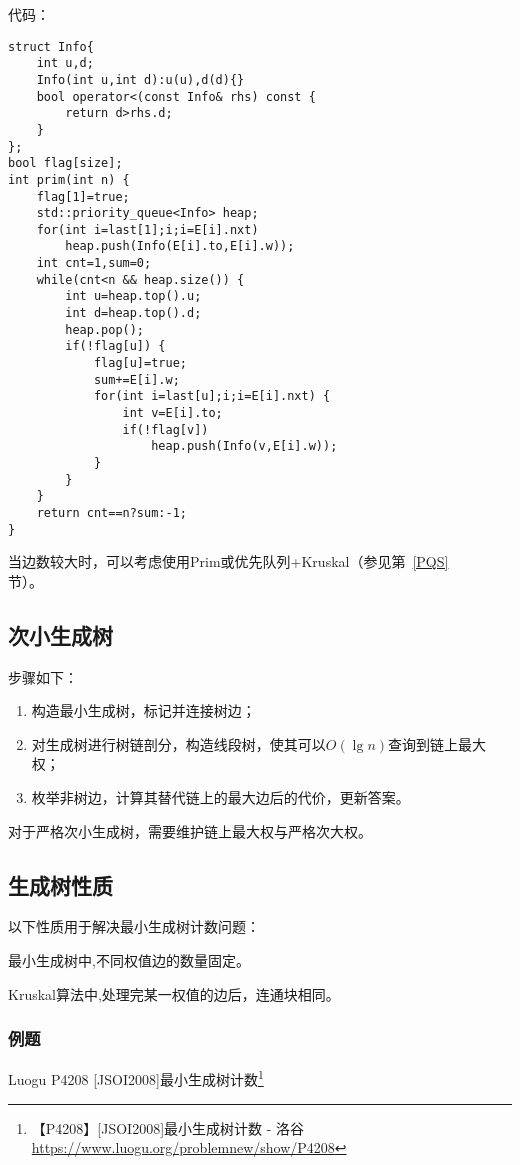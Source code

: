 代码：
\begin{lstlisting}
struct Info{
    int u,d;
    Info(int u,int d):u(u),d(d){}
    bool operator<(const Info& rhs) const {
        return d>rhs.d;
    }
};
bool flag[size];
int prim(int n) {
    flag[1]=true;
    std::priority_queue<Info> heap;
    for(int i=last[1];i;i=E[i].nxt)
        heap.push(Info(E[i].to,E[i].w));
    int cnt=1,sum=0;
    while(cnt<n && heap.size()) {
        int u=heap.top().u;
        int d=heap.top().d;
        heap.pop();
        if(!flag[u]) {
            flag[u]=true;
            sum+=E[i].w;
            for(int i=last[u];i;i=E[i].nxt) {
                int v=E[i].to;
                if(!flag[v])
                    heap.push(Info(v,E[i].w));
            }
        }
    }
    return cnt==n?sum:-1;
}
\end{lstlisting}

当边数较大时，可以考虑使用Prim或优先队列+Kruskal（参见第~\ref{PQS}\\节）。

\subsection{次小生成树}
步骤如下：
\begin{enumerate}
	\item 构造最小生成树，标记并连接树边；
	\item 对生成树进行树链剖分，构造线段树，使其可以$O(\lg n)$查询到链上最大权；
	\item 枚举非树边，计算其替代链上的最大边后的代价，更新答案。
\end{enumerate}

对于严格次小生成树，需要维护链上最大权与严格次大权。

\subsection{生成树性质}
以下性质用于解决最小生成树计数问题：
\begin{property}
	最小生成树中,不同权值边的数量固定。
\end{property}
\begin{property}
	Kruskal算法中,处理完某一权值的边后，连通块相同。
\end{property}
\subsubsection{例题}

Luogu P4208 [JSOI2008]最小生成树计数\footnote{
【P4208】[JSOI2008]最小生成树计数 - 洛谷
\url{https://www.luogu.org/problemnew/show/P4208}
}

